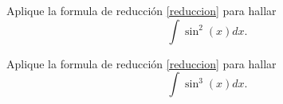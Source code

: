  \begin{resuelto}
  Aplique la formula de reducci\'on \eqref{reduccion} para hallar
  $$
  \displaystyle \int \sin^{2}(x)dx.
  $$
 \end{resuelto}




  \begin{resuelto}
  Aplique la formula de reducci\'on \eqref{reduccion} para hallar
  $$
  \displaystyle \int \sin^{3}(x)dx.
  $$
 \end{resuelto}
%
%
%
%
%
%
%
%
%
%
%
%
%
%
%
%
%
%
%
%
%
%
%
%
%
%
%
%
%
%
%
%
%
%
%
%
%
